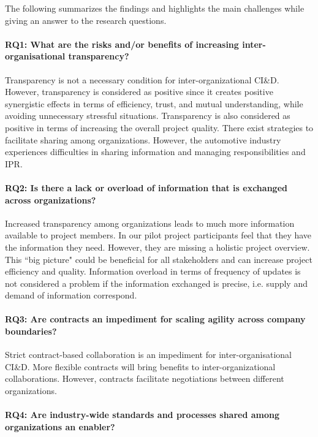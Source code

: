 The following summarizes the findings and highlights the main challenges while giving an answer to the research questions.

\paragraph*{RQ1: What are the risks and/or benefits of increasing inter-organisational transparency?} %
Transparency is not a necessary condition for inter-organizational CI\&D. However, transparency is considered as positive since it creates positive %
{synergistic} effects in terms of efficiency, trust, and mutual understanding, while avoiding unnecessary stressful situations. Transparency is also considered as positive in terms of increasing the overall project quality. 
There exist strategies to facilitate sharing among organizations. However, the automotive industry experiences difficulties in sharing information and managing responsibilities and IPR.
\paragraph*{RQ2: Is there a lack or overload of information that is exchanged across organizations?} %
Increased transparency among organizations leads to much more information available to project members. In our pilot project participants feel that they have the information they need. However, they are missing a holistic project overview. This ``big picture" could be beneficial for all stakeholders and can increase project efficiency and quality. Information overload in terms of frequency of updates is not considered a problem if the information exchanged is precise, i.e. supply and demand of information correspond.
\paragraph*{RQ3: Are contracts an impediment for scaling agility across company boundaries?} %
Strict contract-based collaboration is an impediment for inter-organisational CI\&D. More flexible contracts will bring benefits to inter-organizational collaborations. However, contracts facilitate negotiations between different organizations. 
\paragraph*{RQ4: Are industry-wide standards and processes shared among organizations an enabler?} %

